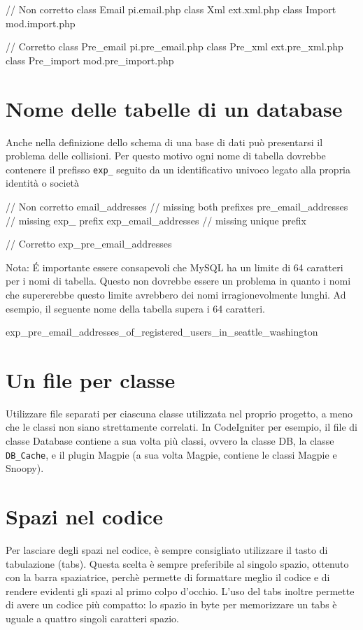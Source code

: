 \begin{code}
// Non corretto
class Email		pi.email.php
class Xml		ext.xml.php
class Import		mod.import.php

// Corretto
class Pre_email		pi.pre_email.php
class Pre_xml		ext.pre_xml.php
class Pre_import	mod.pre_import.php
\end{code}

\section{Nome delle tabelle di un database}
Anche nella definizione dello schema di una base di dati può presentarsi il problema delle collisioni. Per questo motivo ogni nome di tabella dovrebbe contenere il prefisso \verb|exp_| seguito da un identificativo univoco legato alla propria identità o società

\begin{code}
// Non corretto
email_addresses		// missing both prefixes
pre_email_addresses	// missing exp_ prefix
exp_email_addresses	// missing unique prefix

// Corretto
exp_pre_email_addresses
\end{code}

Nota: \'E importante essere consapevoli che MySQL ha un limite di 64 caratteri per i nomi di tabella. Questo non dovrebbe essere un problema in quanto i nomi che supererebbe questo limite avrebbero dei nomi irragionevolmente lunghi. Ad esempio, il seguente nome della tabella supera i 64 caratteri. 

\begin{code}
exp_pre_email_addresses_of_registered_users_in_seattle_washington
\end{code}

\section{Un file per classe}
Utilizzare file separati per ciascuna classe utilizzata nel proprio progetto, a meno che le classi non siano strettamente correlati. In CodeIgniter per esempio, il file di classe Database contiene a sua volta più classi, ovvero la classe DB, la classe \verb|DB_Cache|, e il plugin Magpie (a sua volta Magpie, contiene le classi Magpie e Snoopy).

\section{Spazi nel codice}
Per lasciare degli spazi nel codice, è sempre consigliato utilizzare il tasto di tabulazione (tabs). Questa scelta è sempre preferibile al singolo spazio, ottenuto con la barra spaziatrice, perchè permette di formattare meglio il codice e di rendere evidenti gli spazi al primo colpo d'occhio. L'uso del tabs inoltre permette di avere un codice più compatto: lo spazio in byte per memorizzare un tabs è uguale a quattro singoli caratteri spazio.

